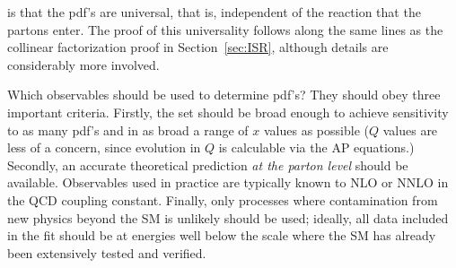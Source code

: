 \documentclass{ws-procs9x6}
\begin{document}
is that the pdf's are universal, that is, independent of the reaction that the partons enter. The proof of this universality follows along the same lines as the collinear factorization proof in Section~\ref{sec:ISR}, although details are considerably more involved. 

Which observables should be used to determine pdf's? They should obey three important criteria. Firstly, the set should be broad enough to achieve sensitivity to as many pdf's and in as broad a range of $x$ values as possible ($Q$ values are less of a concern, since evolution in $Q$ is calculable via the AP equations.) Secondly, an accurate theoretical prediction {\it at the parton level} should be available. Observables used in practice are typically known to NLO or NNLO in the QCD coupling constant. Finally, only processes where contamination from new physics beyond the SM is unlikely should be used; ideally, all data  included in the fit should be at energies well below the scale where the SM has already been extensively tested and verified.
\end{document}
